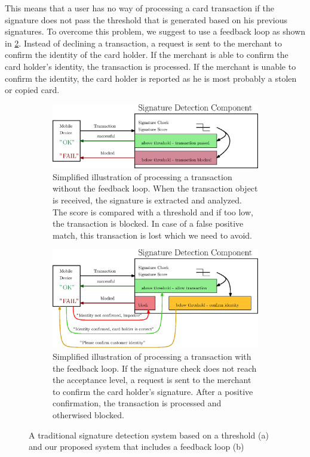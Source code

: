\documentclass[a4paper, oneside]{csthesis}
\begin{document}
This means that a user has no way of processing a card transaction if the signature does not pass the threshold that is generated based on his previous signatures. To overcome this problem, we suggest to use a feedback loop as shown in \ref{fig:fb-loop2}. Instead of declining a transaction, a request is sent to the merchant to confirm the identity of the card holder. If the merchant is able to confirm the card holder's identity, the transaction is processed. If the merchant is unable to confirm the identity, the card holder is reported as he is most probably a stolen or copied card.

\begin{figure}
        \centering
        \begin{subfigure}[b]{\textwidth}
                \centering
                \includegraphics[width=1\textwidth]{figures/fb-loop1.eps}
                \caption{Simplified illustration of processing a transaction without the feedback loop. When the transaction object is received, the signature is extracted and analyzed. The score is compared with a threshold and if too low, the transaction is blocked. In case of a false positive match, this transaction is lost which we need to avoid.}
                \label{fig:fb-loop1}
        \end{subfigure}%

        \begin{subfigure}[b]{\textwidth}
                \centering
                \includegraphics[width=1\textwidth]{figures/fb-loop2.eps}
                \caption{Simplified illustration of processing a transaction with the feedback loop. If the signature check does not reach the acceptance level, a request is sent to the merchant to confirm the card holder's signature. After a positive confirmation, the transaction is processed and otherwised blocked.}
                \label{fig:fb-loop2}
        \end{subfigure}%
        \caption{A traditional signature detection system based on a threshold (a) and our proposed system that includes a feedback loop (b) }
        \label{fig:feedback-loop}
\end{figure}
\end{document}
